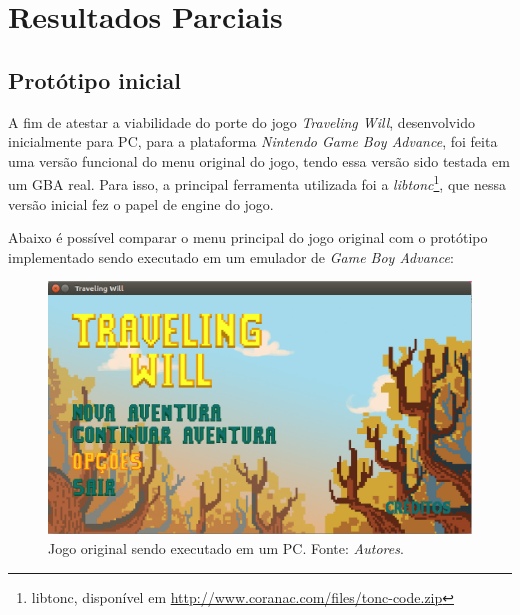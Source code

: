 \chapter[Resultados Parciais]{Resultados Parciais}

\section{Protótipo inicial}

A fim de atestar a viabilidade do porte do jogo \textit{Traveling Will}, desenvolvido inicialmente para PC, para a plataforma \textit{Nintendo Game Boy Advance}, foi feita uma versão funcional do menu original do jogo, tendo essa versão sido testada em um GBA real. Para isso, a principal ferramenta utilizada foi a \textit{libtonc}\footnote{libtonc, disponível em \url{http://www.coranac.com/files/tonc-code.zip}}, que nessa versão inicial fez o papel de engine do jogo.

Abaixo é possível comparar o menu principal do jogo original com o protótipo implementado sendo executado em um emulador de \textit{Game Boy Advance}:

\begin{figure}[H]
 \centering \includegraphics[keepaspectratio=true,scale=0.6]{figuras/tw-original-1.eps}
   \caption[Jogo original sendo executado em um PC]
    {Jogo original sendo executado em um PC. Fonte: \textit{Autores}.}
   \label{tw-original-1}
\end{figure}

